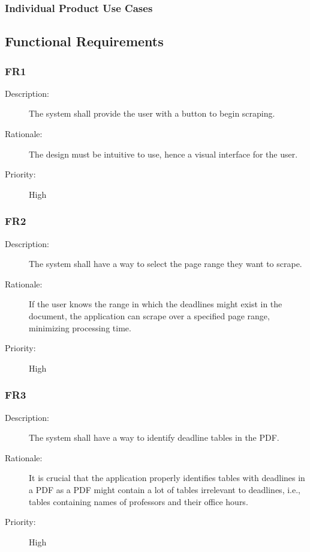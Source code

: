 \documentclass[12pt, titlepage]{article}
\begin{document}
\subsubsection{Individual Product Use Cases}

\subsection{Functional Requirements}

\subsubsection{FR1}

\begin{description}
  \item[Description:] The system shall provide the user with a button to begin scraping. 
  \item[Rationale:] The design must be intuitive to use, hence a visual interface for the user. 
  \item[Priority:] High
\end{description}

\subsubsection{FR2}

\begin{description}
  \item[Description:] The system shall have a way to select the page range they want to scrape. 
  \item[Rationale:] If the user knows the range in which the deadlines might exist in the document, the application can scrape over a specified page range, minimizing processing time. 
  \item[Priority:] High
\end{description}

\subsubsection{FR3}

\begin{description}
  \item[Description:] The system shall have a way to identify deadline tables in the PDF.
  \item[Rationale:] It is crucial that the application properly identifies tables with deadlines in a PDF as a PDF might contain a lot of tables irrelevant to deadlines, i.e., tables containing names of professors and their office hours. 
  \item[Priority:] High
\end{description}
\end{document}
